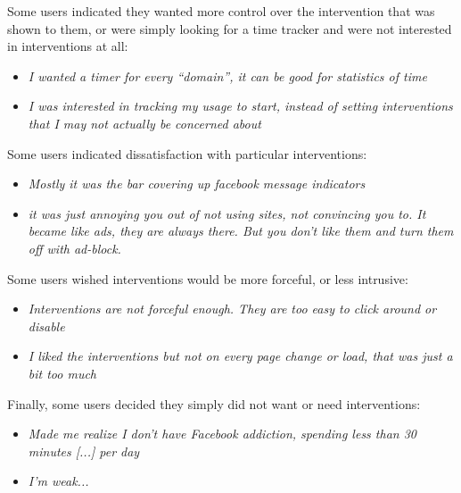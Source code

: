 Some users indicated they wanted more control over the intervention that was shown to them, or were simply looking for a time tracker and were not interested in interventions at all:
\begin{itemize}
\item \textit{I wanted a timer for every ``domain'', it can be good for statistics of time}
\item \textit{I was interested in tracking my usage to start, instead of setting interventions that I may not actually be concerned about}
\end{itemize}

Some users indicated dissatisfaction with particular interventions:
\begin{itemize}
\item \textit{Mostly it was the bar covering up facebook message indicators}
\item \textit{it was just annoying you out of not using sites, not convincing you to. It became like ads, they are always there. But you don't like them and turn them off with ad-block.}

\end{itemize}

Some users wished interventions would be more forceful, or less intrusive:
\begin{itemize}
\item \textit{Interventions are not forceful enough. They are too easy to click around or disable}
\item \textit{I liked the interventions but not on every page change or load, that was just a bit too much}
\end{itemize}

Finally, some users decided they simply did not want or need interventions:
\begin{itemize}
\item \textit{Made me realize I don't have Facebook addiction, spending less than 30 minutes [...] per day} %
\item \textit{I'm weak...}
\end{itemize}


